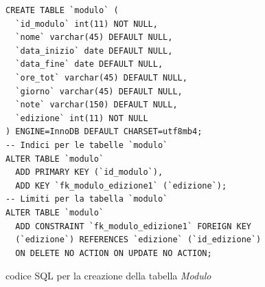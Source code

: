 \begin{listing}[h]
\begin{verbatim}
CREATE TABLE `modulo` (
  `id_modulo` int(11) NOT NULL,
  `nome` varchar(45) DEFAULT NULL,
  `data_inizio` date DEFAULT NULL,
  `data_fine` date DEFAULT NULL,
  `ore_tot` varchar(45) DEFAULT NULL,
  `giorno` varchar(45) DEFAULT NULL,
  `note` varchar(150) DEFAULT NULL,
  `edizione` int(11) NOT NULL
) ENGINE=InnoDB DEFAULT CHARSET=utf8mb4;
-- Indici per le tabelle `modulo`
ALTER TABLE `modulo`
  ADD PRIMARY KEY (`id_modulo`),
  ADD KEY `fk_modulo_edizione1` (`edizione`);
-- Limiti per la tabella `modulo`
ALTER TABLE `modulo`
  ADD CONSTRAINT `fk_modulo_edizione1` FOREIGN KEY
  (`edizione`) REFERENCES `edizione` (`id_edizione`)
  ON DELETE NO ACTION ON UPDATE NO ACTION;
\end{verbatim}
\caption{codice SQL per la creazione della tabella \textit{Modulo}}
\label{code:sql}
\end{listing}


\clearpage
\newpage
